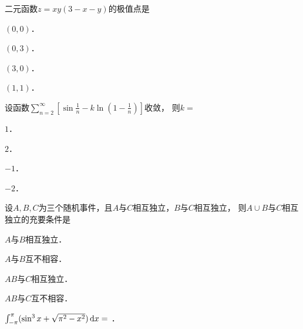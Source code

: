 \documentclass[plain,noanswer,medmath]{../../template/jnuexam}
\begin{document}








\begin{problem}
二元函数$z = xy(3 - x - y)$的极值点是\pickout{}
\begin{abcd}
\item $(0,0)$．
\item $(0,3)$．
\item $(3,0)$．
\item $(1,1)$．
\end{abcd}
\end{problem}




\begin{problem}
设函数$\sum_{n = 2}^{\infty}\left[\sin\frac{1}{n} - k\ln\left(1 - \frac{1}{n}\right)\right]$收敛，
则$k =$\pickout{}
\begin{abcd}
\item $1$．
\item $2$．
\item $- 1$．
\item $- 2$．
\end{abcd}
\end{problem}






\begin{problem}
设$A,B,C$为三个随机事件，且$A$与$C$相互独立，$B$与$C$相互独立，
则$A \cup B$与$C$相互独立的充要条件是\pickout{}
\begin{abcd}
\item $A$与$B$相互独立．
\item $A$与$B$互不相容．
\item $AB$与$C$相互独立．
\item $AB$与$C$互不相容．
\end{abcd}
\end{problem}






\begin{problem}
$\int_{- \pi}^{\pi}(\sin^3 x + \sqrt{\pi^2 - x^2}) \mathop{}\!\mathrm{d} x =$ \fillin{}．
\end{problem}
\end{document}
